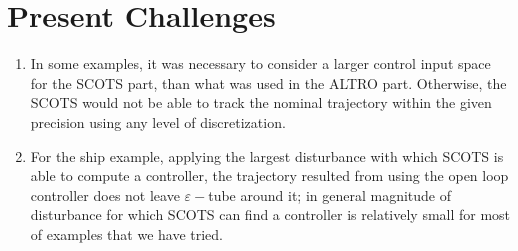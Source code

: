 %
%





\section{Present Challenges}

\begin{enumerate}
	\item In some examples, it was necessary to consider a larger control input space for the SCOTS part, than what was used in the ALTRO part.
	Otherwise, the SCOTS would not be able to track the nominal trajectory within the given precision using any level of discretization. 
	\item For the ship example, applying the largest disturbance with which SCOTS is able to compute a controller, the trajectory resulted from using the open loop controller does not leave  $\varepsilon-$tube around it; in general magnitude of disturbance for which SCOTS can find a controller is relatively small for most of examples that we have tried.
\end{enumerate}




